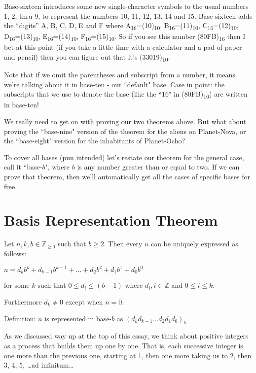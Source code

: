\documentclass{article}
\newenvironment{jprIn1}{\begin{adjustwidth}{3em}{}}{\end{adjustwidth}}
\begin{document}
Base-sixteen introduces some new single-character symbols to the usual numbers 1,
2, thru 9,
to represent the numbers 10, 11, 12, 13, 14 and 15.
Base-sixteen adds the ``digits'' A, B, C, D, E and F where
A\textsubscript{16}=(10)\textsubscript{10},
B\textsubscript{16}=(11)\textsubscript{10},
C\textsubscript{16}=(12)\textsubscript{10},
D\textsubscript{16}=(13)\textsubscript{10},
E\textsubscript{16}=(14)\textsubscript{10},
F\textsubscript{16}=(15)\textsubscript{10}.
So if you see this number (80FB)\textsubscript{16} then
I bet at this point (if you take a little time with a
calculator and a pad of paper and pencil) then you can
figure out that it's (33019)\textsubscript{10}.

Note that if we omit the parentheses and subscript from a number,
it means we're talking about it in base-ten - our ``default" base.
Case in point: the subscripts that we use to denote the base
(like the ``16" in (80FB)\textsubscript{16}) are written in base-ten!

We really need to get on with proving our two theorems above.
But what about proving the ``base-nine" version of the theorem for the aliens on Planet-Nova,
or the ``base-eight" version for the inhabitants of Planet-Ocho?

To cover all bases (pun intended) let's restate our theorem for the general case,
call it ``base-$b$",
where $b$ is any number greater than or equal to two.
If we can prove that theorem,
then we'll automatically get all the cases of specific bases for free.

\section*{Basis Representation Theorem}

\begin{jprIn1}
Let $n,k,b\in \mathbb{Z}_{\ge 0}$ such that $b\ge2$.
Then every $n$ can be uniquely expressed as follows:

\hspace{3em}$n=d_kb^k+d_{k-1}b^{k-1}+\dots+d_2b^2+d_1b^1+d_0b^0$

for some $k$ such that $0 \le d_i \le (b-1)$ where $d_i,i\in\mathbb{Z}$ and $0 \le i \le k$.

Furthermore $d_k\ne0$ except when $n=0$.

Definition: $n$ is represented in base-$b$ as $(d_kd_{k-1}\dots{}d_2d_1d_0)_b$
\end{jprIn1}
\bigskip

As we discussed way up at the top of this essay,
 we think about positive integers as a process that builds them up one by one.
That is, each successive integer is one more than the previous one,
starting at 1, then one more
taking us to 2,
then 3, 4, 5, \dots{}ad infinitum\dots
\end{document}
